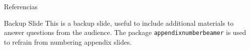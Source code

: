 \documentclass{beamer}
\begin{document}
\appendix

\begin{frame}{Referencias}
	
	
\end{frame}


\begin{frame}{Backup Slide}
	This is a backup slide, useful to include additional materials to answer questions from the audience.
	\vfill
	The package \texttt{appendixnumberbeamer} is used to refrain from numbering appendix slides.
\end{frame}

\end{document}
